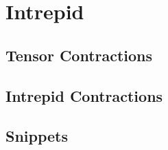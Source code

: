 \chapter{Intrepid}
\section{Tensor Contractions}
\section{Intrepid Contractions}
\section{Snippets}


